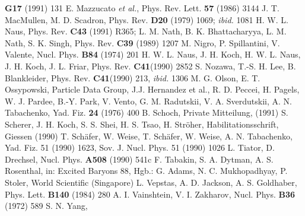 \begin{thebibliography}{ABC.99}
              {\bf G17} (1991) 131      
 E. Mazzucato {\em et al.}, Phys. Rev. Lett.
              {\bf 57} (1986) 3144
 J. T. MacMullen, M. D. Scadron, Phys. Rev. {\bf D20}
              (1979)  1069; {\em ibid.} 1081
 H. W. L. Naus, Phys. Rev. {\bf C43} (1991) R365; 
 L. M. Nath, B. K. Bhattacharyya, 
 L. M. Nath, S. K. Singh, Phys. Rev. 
              {\bf C39} (1989) 1207 
 M. Nigro, P. Spillantini, V. Valente, Nucl. Phys.
              {\bf B84} (1974) 201	      	      
   H. W. L. Naus, J. H. Koch, 	      
 H. W. L. Naus, J. H. Koch, J. L. Friar,
              Phys. Rev. {\bf C41}(1990) 2852	      
 S. Nozawa, T.-S. H. Lee, B. Blankleider, 
              Phys. Rev. {\bf C41}(1990) 213, {\em ibid.} 1306	      
 M. G. Olson, E. T. Ossypowski,  	      
 Particle Data Group, J.J. Hernandez et al.,
 R. D. Peccei, 
 H. Pagels, W. J. Pardee, 
 B.-Y. Park, V. Vento, 	      
G. M. Radutskii, V. A. Sverdutskii, 
              A. N. Tabachenko, Yad. Fiz. {\bf 24} (1976) 400
 B. Schoch, Private Mitteilung, (1991) 	      
 S. Scherer, J. H. Koch, 
 S. S. Shei, H. S. Tsao, 
 H. Str\"oher, Habilitationsschrift, 
              Giessen (1990)
 T. Sch\"afer, W. Weise, 
 T. Sch\"afer, W. Weise,      	       
 A. N. Tabachenko, Yad. Fiz. 51 (1990) 1623,
              Sov. J. Nucl. Phys. 51 (1990) 1026 	      
 L. Tiator, D. Drechsel, Nucl. Phys. 
              {\bf A508} (1990) 541c	      
 F. Tabakin, S. A. Dytman, A. S. Rosenthal, in:
              Excited Baryons 88, Hgb.: G. Adams, N. C. Mukhopadhyay,
	      P. Stoler, World Scientific (Singapore)   	      
 L. Vepstas, A. D. Jackson, A. S. Goldhaber, Phys. Lett.
              {\bf B140} (1984) 280	                          
  A. I. Vainshtein, V. I. Zakharov, Nucl. Phys.
              {\bf B36} (1972) 589
 S. N. Yang,

\end{thebibliography}

